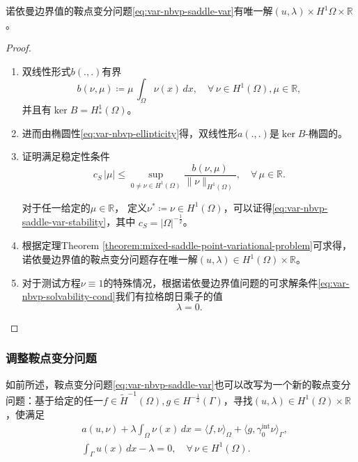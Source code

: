 \begin{theorem}[诺依曼边界值问题的鞍点变分法求解]
  \label{theorem:var-nbvp-saddle-var-solution}
  诺依曼边界值的鞍点变分问题\eqref{eq:var-nbvp-saddle-var}有唯一解$(u,\lambda) \times H^{1}{\Omega} \times \mathbb{R}$。
\end{theorem}
\begin{proof}
  \begin{enumerate}
    \item 双线性形式$b(.,.)$有界
    \begin{equation*}
      b(\nu,\mu) \coloneqq \mu \, \int_{\Omega} \nu(x) \, dx, \quad \forall \, \nu \in H^{1}(\Omega), \mu \in \mathbb{R},
    \end{equation*}
并且有$\ker B = H_{*}^{1}(\Omega)$。

    \item 进而由椭圆性\eqref{eq:var-nbvp-ellipticity}得，双线性形$a(.,.)$是$\ker B$-椭圆的。

\item 证明满足稳定性条件
\begin{equation}
  \label{eq:var-nbvp-saddle-var-stability}
  c_{S} \, \big| \mu \big| \le \sup_{0 \neq \nu \in H^{1}(\Omega)}
  \frac{
  b(\nu,\mu)
  }{
  \big\| \nu \big\|_{H^{1}(\Omega)}
  }, \quad \forall \, \mu \in \mathbb{R}.
\end{equation}

对于任一给定的$\mu \in \mathbb{R}$， 定义$\nu^{*} \coloneqq \nu \in H^{1}(\Omega)$，可以证得\eqref{eq:var-nbvp-saddle-var-stability}，其中
$ c_S = | \Omega |^{-\frac{1}{2}}$。

\item 根据定理Theorem \ref{theorem:mixed-saddle-point-variational-problem}可求得，诺依曼边界值的鞍点变分问题存在唯一解$(u,\lambda) \in H^{1}(\Omega) \times \mathbb{R}$。

\item 对于测试方程$\nu \equiv 1$的特殊情况，根据诺依曼边界值问题的可求解条件\eqref{eq:var-nbvp-solvability-cond}我们有拉格朗日乘子的值
\begin{equation*}
  \lambda = 0.
\end{equation*}
  \end{enumerate}
\end{proof}



\subsubsection{调整鞍点变分问题}
如前所述，鞍点变分问题\eqref{eq:var-nbvp-saddle-var}也可以改写为一个新的鞍点变分问题：基于给定的任一$f \in \widetilde{H}^{-1}(\Omega), g \in H^{-\frac{1}{2}}(\Gamma)$，寻找$(u,\lambda) \in H^{1}(\Omega) \times \mathbb{R}$，使满足
\begin{equation}
\begin{split}
  \label{eq:var-nbvp-saddle-modified-var}
  &a(u,\nu) + \lambda \int_{\Omega} \nu(x) \, dx = \langle f, \nu \rangle_{\Omega} + \langle g, \gamma_{0}^{\text{int}} \nu \rangle_{\Gamma}, \\
  & \int_{\Gamma} u(x) \, dx - \lambda = 0, \quad \forall \, \nu \in H^{1}(\Omega).
\end{split}
\end{equation}

